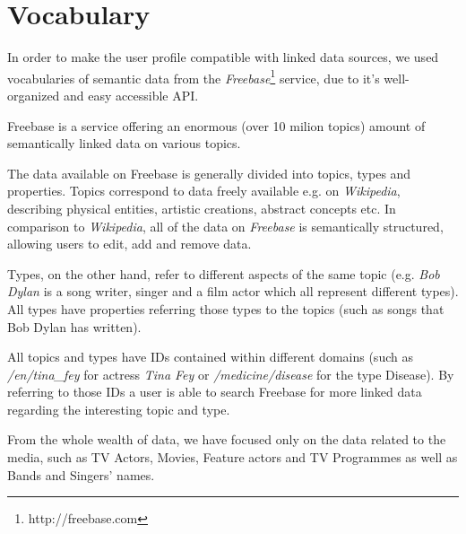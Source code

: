 \section{Vocabulary}

In order to make the user profile compatible with linked data sources, we used
vocabularies of semantic data from the \textit{Freebase}\footnote[1]{http://freebase.com} service, due to it's
well-organized and easy accessible API.

Freebase is a service offering an enormous (over 10 milion topics) amount of semantically linked data on various topics.

The data available on Freebase is generally divided into topics, types and properties. Topics correspond to data freely
available e.g. on \textit{Wikipedia}, describing physical entities, artistic creations, abstract concepts etc. In comparison
to \textit{Wikipedia}, all of the data on \textit{Freebase} is semantically structured, allowing users to edit, add and remove data.

Types, on the other hand, refer to different aspects of the same topic (e.g. \textit{Bob Dylan} is a song writer,
singer and a film actor which all represent different types). All types have properties referring those
types to the topics (such as songs that Bob Dylan has written).

All topics and types have IDs contained within different domains (such as \textit{/en/tina\_fey} for actress \textit{Tina Fey}
or \textit{/medicine/disease} for the type Disease). By referring to those IDs a user is able to search Freebase for
more linked data regarding the interesting topic and type.

From the whole wealth of data, we have focused only on the data related to the media, such as TV Actors, Movies, Feature
actors and TV Programmes as well as Bands and Singers' names.